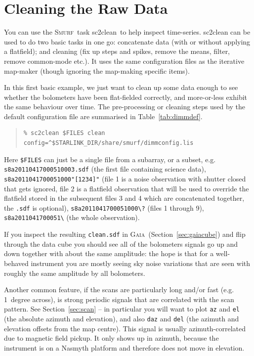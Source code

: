 \documentclass[twoside,11pt]{article}
\newcommand{\htmlref}[2]{#1}
\newcommand{\latexhtml}[2]{#1}
\newcommand{\xref}[3]{#1}
\newcommand{\xlabel}[1]{}
\renewcommand{\_}{\texttt{\symbol{95}}}
\newenvironment{myquote}{\begin{quote}\begin{small}}{\end{small}\end{quote}}
\newcommand{\gaia}{\xref{\textsc{Gaia}}{sun214}{}}
\newcommand{\smurf}{\xref{\textsc{Smurf}}{sun258}{}}
\newcommand{\task}[1]{\textsf{#1}}
\newcommand{\clean}{\xref{\task{sc2clean}}{sun258}{SC2CLEAN}}
\newcommand{\cref}[3]{\latexhtml{#1~\ref{#2}}{\htmlref{#3}{#2}}}
\begin{document}
\newpage
\appendix

\section{\xlabel{app_clean}Cleaning the Raw Data}
\label{app:clean}

You can use the \smurf\ task \clean\ to help inspect time-series.
\task{sc2clean} can be used to do two basic tasks in one go: concatenate data
(with or without applying a flatfield); and cleaning (fix up steps and
spikes, remove the means, filter, remove common-mode etc.). It uses
the same configuration files as the iterative map-maker (though
ignoring the map-making specific items).

In this first basic example, we just want to clean up some data enough
to see whether the bolometers have been flat-fielded correctly, and
more-or-less exhibit the same behaviour over time.  The pre-processing
or cleaning steps used by the default configuration file are
summarised in \cref{Table}{tab:dimmdef}{this table}.

\begin{myquote}
\begin{verbatim}
% sc2clean $FILES clean config=^$STARLINK_DIR/share/smurf/dimmconfig.lis
\end{verbatim}
\end{myquote}

Here \texttt{\$FILES} can just be a single file from a subarray, or a
subset, e.g. \texttt{s8a20110417\_00051\_0003.sdf} (the first file
containing science data), \texttt{s8a20110417\_00051\_000"[1234]"}
(file 1 is a noise observation with shutter closed that gets ignored,
file 2 is a flatfield observation that will be used to override the
flatfield stored in the subsequent files 3 and 4 which are
concatenated together, the \texttt{.sdf} is optional),
\texttt{s8a20110417\_00051\_000\textbackslash?} (files 1 through 9),
\texttt{s8a20110417\_00051\_\textbackslash*} (the whole observation).

If you inspect the resulting \texttt{clean.sdf} in \gaia\
(\cref{Section}{sec:gaiacube}{Displaying time-series data}) and flip
through the data cube you should
see all of the bolometers signals go up and down together with about
the same amplitude: the hope is that for a well-behaved instrument you
are mostly seeing sky noise variations that are seen with roughly the
same amplitude by all bolometers.

Another common feature, if the scans are particularly long and/or fast
(e.g. 1~degree across), is strong periodic signals that are correlated
with the scan pattern. See \cref{Section}{sec:scan}{Displaying scan
patterns} -- in particular
you will want to plot \texttt{az} and \texttt{el} (the absolute
azimuth and elevation), and also \texttt{daz} and \texttt{del} (the
azimuth and elevation offsets from the map centre). This signal is
usually azimuth-correlated due to magnetic field pickup. It only shows
up in azimuth, because the instrument is on a Nasmyth platform and
therefore does not move in elevation.
\end{document}
